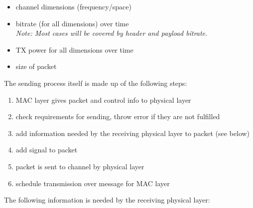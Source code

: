 \begin{itemize}

 \item channel dimensions (frequency/space)
 \item bitrate (for all dimensions) over time\\
 \emph{Note: Most cases will be covered by header and payload bitrate.}
 \item TX power for all dimensions over time
 
 \item size of packet
\end{itemize}


The sending process itself is made up of the following steps:

\begin{enumerate}
 \item MAC layer gives packet and control info to physical layer
 \item check requirements for sending, throw error if they are not fulfilled
 \item add information needed by the receiving physical layer to packet (see below)
 \item add signal to packet
 \item packet is sent to channel by physical layer
 \item schedule transmission over message for MAC layer
\end{enumerate}

The following information is needed by the receiving physical layer:

